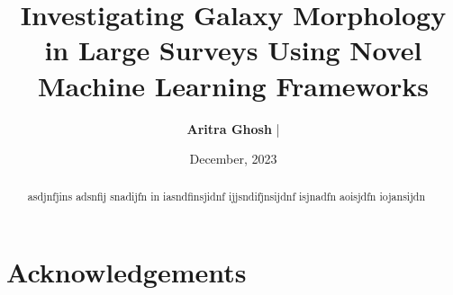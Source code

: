 \documentclass[letterpaper,10pt]{yalephd}
\begin{document}
\title{Investigating Galaxy Morphology in Large Surveys Using Novel Machine Learning Frameworks} %
\author{\textbf{Aritra Ghosh} | }
\date{December, 2023} %

\frontmatter

\begin{abstract}
asdjnfjins adsnfij snadijfn in iasndfinsjidnf ijjsndifjnsijdnf isjnadfn aoisjdfn iojansijdn
\end{abstract}


\maketitle
{} %
\tableofcontents
\listoffigures %
\listoftables %

\chapter{Acknowledgements} %


\mainmatter



\begin{subappendices}
    
\end{subappendices}

\begin{subappendices}
    
\end{subappendices}

\begin{subappendices}
    
\end{subappendices}

\begin{subappendices}
     
\end{subappendices}


\backmatter



\end{document}

